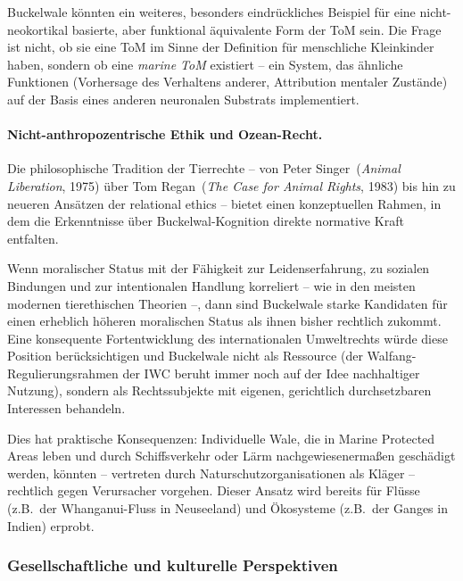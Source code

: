 ﻿\documentclass[12pt,a4paper]{article}
\theoremstyle{definition}
\theoremstyle{remark}
\begin{document}
Buckelwale könnten ein weiteres, besonders eindrückliches Beispiel für eine nicht-neokortikal basierte, aber funktional äquivalente Form der ToM sein. Die Frage ist nicht, ob sie eine ToM im Sinne der Definition für menschliche Kleinkinder haben, sondern ob eine \emph{marine ToM} existiert -- ein System, das ähnliche Funktionen (Vorhersage des Verhaltens anderer, Attribution mentaler Zustände) auf der Basis eines anderen neuronalen Substrats implementiert.

\paragraph{Nicht-anthropozentrische Ethik und Ozean-Recht.}
Die philosophische Tradition der Tierrechte -- von Peter Singer~(\emph{Animal Liberation}, 1975) über Tom Regan~(\emph{The Case for Animal Rights}, 1983) bis hin zu neueren Ansätzen der relational ethics -- bietet einen konzeptuellen Rahmen, in dem die Erkenntnisse über Buckelwal-Kognition direkte normative Kraft entfalten.

Wenn moralischer Status mit der Fähigkeit zur Leidenserfahrung, zu sozialen Bindungen und zur intentionalen Handlung korreliert -- wie in den meisten modernen tierethischen Theorien --, dann sind Buckelwale starke Kandidaten für einen erheblich höheren moralischen Status als ihnen bisher rechtlich zukommt. Eine konsequente Fortentwicklung des internationalen Umweltrechts würde diese Position berücksichtigen und Buckelwale nicht als Ressource (der Walfang-Regulierungsrahmen der IWC beruht immer noch auf der Idee nachhaltiger Nutzung), sondern als Rechtssubjekte mit eigenen, gerichtlich durchsetzbaren Interessen behandeln.

Dies hat praktische Konsequenzen: Individuelle Wale, die in Marine Protected Areas leben und durch Schiffsverkehr oder Lärm nachgewiesenermaßen geschädigt werden, könnten -- vertreten durch Naturschutzorganisationen als Kläger -- rechtlich gegen Verursacher vorgehen. Dieser Ansatz wird bereits für Flüsse (z.B.\ der Whanganui-Fluss in Neuseeland) und Ökosysteme (z.B.\ der Ganges in Indien) erprobt.

\subsubsection{Gesellschaftliche und kulturelle Perspektiven}
\end{document}
